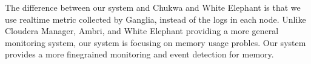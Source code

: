 The difference between our system and Chukwa and White Elephant is that we use real­time metric collected by Ganglia, instead of the logs in each node. Unlike Cloudera Manager, Ambri, and White Elephant providing a more general monitoring system, our system is focusing on memory usage probles. Our system provides a more fine­grained monitoring and event detection for memory.


